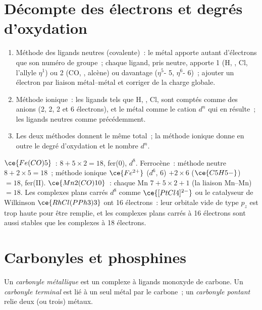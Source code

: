 \section{Décompte des électrons et degrés d'oxydation}

\begin{method}\label{met:b3:organometallic-bonding:count}
\begin{enumerate}
  \item Méthode des ligands neutres (covalente)~: le métal apporte autant
        d'électrons que son numéro de groupe~; chaque ligand, pris neutre,
        apporte 1 (H, , Cl, l'allyle
        $\eta^1$) ou 2 (CO, , alcène) ou davantage ($\eta^5$- 5, $\eta^6$- 6)~; ajouter un électron
        par liaison métal--métal et corriger de la charge globale.
  \item Méthode ionique~: les ligands tels que H, , Cl, 
        sont comptés comme des anions (2, 2, 2 et 6 électrons), et le métal
        comme le cation $d^n$ qui en résulte~; les ligands neutres comme
        précédemment.
  \item Les deux méthodes donnent le même total~; la méthode ionique donne
        en outre le degré d'oxydation et le nombre $d^n$.
\end{enumerate}
\end{method}

\begin{example}[Décompte]\label{ex:b3:organometallic-bonding:count}
$\ce{Fe(CO)5}$~: $8 + 5 \times 2 = 18$, fer(0), $d^8$. Ferrocène~: méthode neutre $8 + 2 \times 5 = 18$~; méthode ionique
$\ce{Fe^{2+}}$ ($d^6$, 6) $+ 2 \times 6$ ($\ce{C5H5-}$) $= 18$, fer(II). $\ce{Mn2(CO)10}$~: chaque Mn $7 + 5 \times 2 + 1$ (la liaison
Mn--Mn) $= 18$. Les complexes plans carrés $d^8$ comme $\ce{[PtCl4]^{2-}}$ ou le catalyseur de
Wilkinson $\ce{RhCl(PPh3)3}$ ont 16 électrons~: leur orbitale vide de type $p_z$ est trop
haute pour être remplie, et les complexes plans carrés à 16 électrons sont
aussi stables que les complexes à 18 électrons.
\end{example}

\section{Carbonyles et phosphines}

\begin{definition}\label{def:b3:organometallic-bonding:carbonyl}
Un \emph{carbonyle métallique} est un complexe à ligands
monoxyde de carbone. Un \emph{carbonyle terminal}
est lié à un seul métal par le carbone~; un \emph{carbonyle pontant} relie
deux (ou trois) métaux.
\end{definition}

